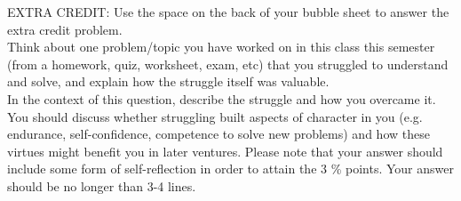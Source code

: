EXTRA CREDIT: Use the space on the back of your bubble sheet to answer the extra credit problem.\\
Think about one problem/topic you have worked on in this class this semester (from a homework, quiz, worksheet, exam, etc) that you struggled to understand and solve, and explain how the struggle itself was valuable.\\
In the context of this question, describe the struggle and how you overcame it. You should discuss whether struggling built aspects of character in you (e.g. endurance, self-confidence, competence to solve new problems) and how these virtues might benefit you in later ventures. Please note that your answer should include some form of self-reflection in order to attain the 3 \% points. Your answer should be no longer than 3-4 lines.


